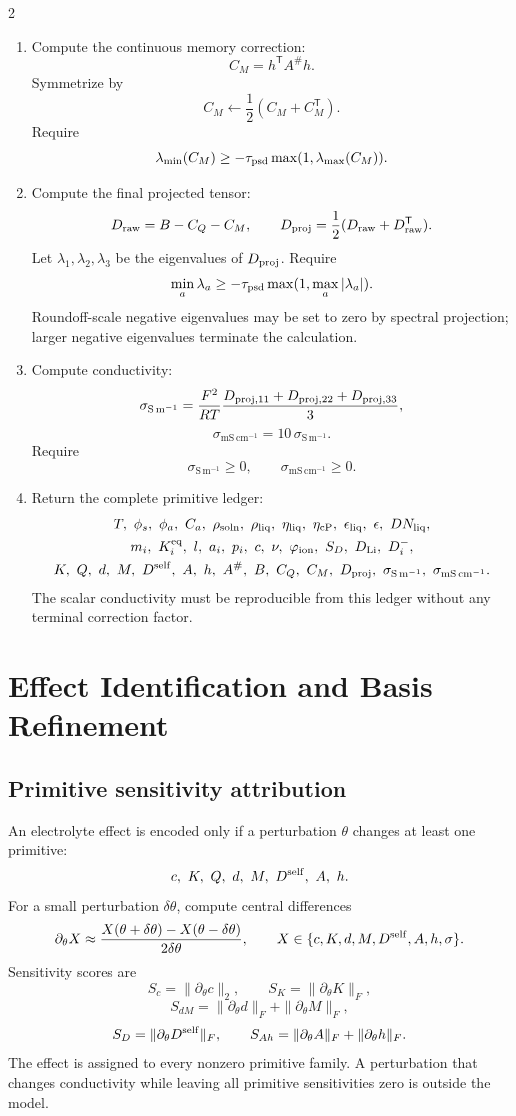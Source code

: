 \documentclass[10pt]{article}
\newcommand{\T}{\mathsf{T}}
\newcommand{\Sm}{\mathrm{S\,m^{-1}}}
\newcommand{\mScm}{\mathrm{mS\,cm^{-1}}}
\begin{document}
\begin{multicols}{2}
\begin{enumerate}[label=\textbf{A\arabic*.}]
\item Compute the continuous memory correction:
\[
C_M=h^\T A^\#h.
\]
Symmetrize by
\[
C_M\leftarrow\frac12(C_M+C_M^\T).
\]
Require
\[
\lambda_{\min}(C_M)\ge-\tau_{\rm psd}\max(1,\lambda_{\max}(C_M)).
\]

\item Compute the final projected tensor:
\[
D_{\rm raw}=B-C_Q-C_M,
\qquad
D_{\rm proj}=\frac12(D_{\rm raw}+D_{\rm raw}^\T).
\]
Let \(\lambda_1,\lambda_2,\lambda_3\) be the eigenvalues of \(D_{\rm proj}\).
Require
\[
\min_a\lambda_a
\ge
-\tau_{\rm psd}\max(1,\max_a|\lambda_a|).
\]
Roundoff-scale negative eigenvalues may be set to zero by spectral projection;
larger negative eigenvalues terminate the calculation.

\item Compute conductivity:
\[
\sigma_{\Sm}
=
\frac{F^2}{RT}\frac{D_{{\rm proj},11}
+D_{{\rm proj},22}
+D_{{\rm proj},33}}{3},
\]
\[
\sigma_{\mScm}=10\,\sigma_{\Sm}.
\]
Require
\[
\sigma_{\Sm}\ge0,
\qquad
\sigma_{\mScm}\ge0.
\]

\item Return the complete primitive ledger:
\[
\begin{gathered}
T,\ \phi_s,\ \phi_a,\ C_a,\ \rho_{\rm soln},\
\rho_{\rm liq},\ \eta_{\rm liq},\ \eta_{\rm cP},\
\epsilon_{\rm liq},\ \epsilon,\ DN_{\rm liq},\\
m_i,\ K_i^{\rm eq},\ l,\ a_i,\ p_i,\ c,\ \nu,\
\varphi_{\rm ion},\ S_D,\ D_{\rm Li},\ D_i^-,\\
K,\ Q,\ d,\ M,\ D^{\rm self},\
A,\ h,\ A^\#,\ B,\ C_Q,\ C_M,\ D_{\rm proj},\
\sigma_{\Sm},\ \sigma_{\mScm}.
\end{gathered}
\]
The scalar conductivity must be reproducible from this ledger without any
terminal correction factor.
\end{enumerate}

\section{Effect Identification and Basis Refinement}

\subsection{Primitive sensitivity attribution}

An electrolyte effect is encoded only if a perturbation \(\theta\) changes at
least one primitive:
\[
c,\ K,\ Q,\ d,\ M,\ D^{\rm self},\ A,\ h.
\]
For a small perturbation \(\delta\theta\), compute central differences
\[
\partial_\theta X
\approx
\frac{X(\theta+\delta\theta)-X(\theta-\delta\theta)}{2\delta\theta},
\qquad
X\in\{c,K,d,M,D^{\rm self},A,h,\sigma\}.
\]
Sensitivity scores are
\[
S_c=\|\partial_\theta c\|_2,
\qquad
S_K=\|\partial_\theta K\|_F,
\]
\[
S_{dM}=\|\partial_\theta d\|_F+\|\partial_\theta M\|_F,
\]
\[
S_D=\|\partial_\theta D^{\rm self}\|_F,
\qquad
S_{Ah}=\|\partial_\theta A\|_F+\|\partial_\theta h\|_F.
\]
The effect is assigned to every nonzero primitive family. A perturbation that
changes conductivity while leaving all primitive sensitivities zero is outside
the model.


\end{multicols}
\end{document}
